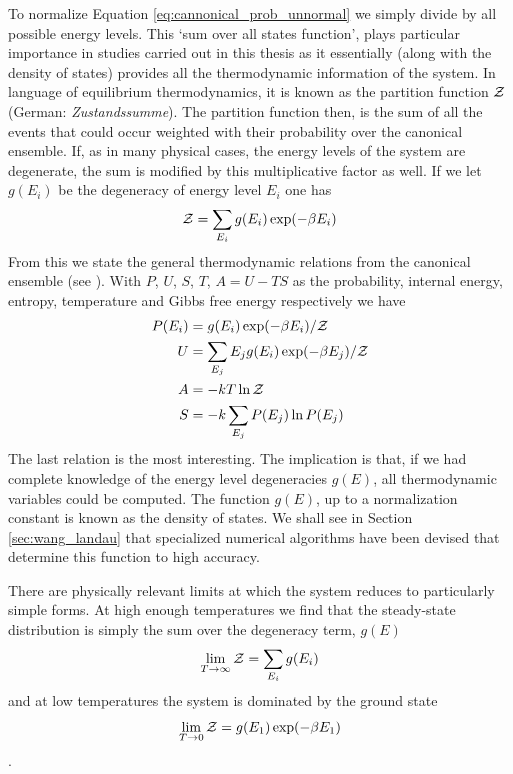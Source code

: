 To normalize Equation \ref{eq:cannonical_prob_unnormal} we simply divide by all possible energy levels. This `sum over all states function', plays particular importance in studies carried out in this thesis as it essentially (along with the density of states) provides all the thermodynamic information of the system. In language of equilibrium thermodynamics, it is known as the partition function $\mathcal{Z}$ (German: \textit{Zustandssumme}). The partition function then, is the sum of all the events that could occur weighted with their probability over the canonical ensemble. If, as in many physical cases, the energy levels of the system are degenerate, the sum is modified by this multiplicative factor as well. If we let $g(E_i)$ be the degeneracy of energy level $E_i$ one has
\begin{equation}
  \mathcal{Z} = \sum_{E_i} g(E_i) \exp(-\beta E_i)
\end{equation}
%
From this we state the general thermodynamic relations from the canonical ensemble (see \citealt[page 53]{pathria_statistical_1996}). With $P$, $U$, $S$, $T$, $A=U-TS$ as the probability, internal energy, entropy, temperature and Gibbs free energy respectively we have
\begin{align}
  P(E_i) &= g(E_i) \exp( - \beta E_i ) / \mathcal{Z} \\
  U &= \sum_{E_j} E_j g(E_i) \exp( - \beta E_j ) / \mathcal{Z} \\
  A &= -k T \ln \mathcal{Z} \\
  S &= -k \sum_{E_j} P(E_j) \ln P(E_j)
\end{align}
The last relation is the most interesting. The implication is that, if we had complete knowledge of the energy level degeneracies $g(E)$, all thermodynamic variables could be computed. The function $g(E)$, up to a normalization constant is known as the density of states. We shall see in Section \ref{sec:wang_landau} that specialized numerical algorithms have been devised that determine this function to high accuracy.

There are physically relevant limits at which the system reduces to particularly simple forms. At high enough temperatures we find that the steady-state distribution is simply the sum over the degeneracy term, $g(E)$
\begin{equation}
  \lim_{T\rightarrow \infty} \mathcal{Z} = \sum_{E_i} g(E_i) 
\end{equation}
and at low temperatures the system is dominated by the ground state
\begin{equation}
  \lim_{T\rightarrow 0} \mathcal{Z} = g(E_1)  \exp(-\beta E_1)
\end{equation}.

